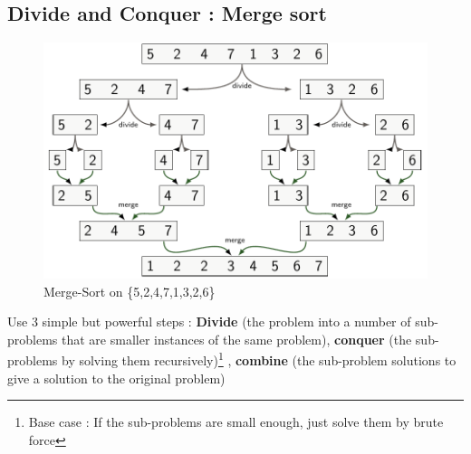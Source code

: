\documentclass[12pt,twoside,a4paper]{article}
\begin{document}
\subsection{Divide and Conquer : Merge sort}
\begin{figure}
	\centering
	\captionsetup{justification=centering}	
	\includegraphics[scale=0.3]{images/mergeSort}
	\caption{Merge-Sort on \{5,2,4,7,1,3,2,6\}}
\end{figure}
Use 3 simple but powerful steps : \textbf{Divide} (the problem into a number of sub-problems that are smaller instances of the same problem), \textbf{conquer} (the sub-problems by solving them recursively)\footnote{Base case : If the sub-problems are small enough, just solve them by brute force} , \textbf{combine} (the sub-problem solutions to give a solution to the original problem)
\end{document}

